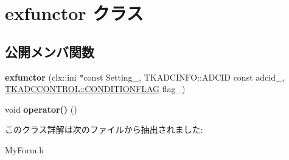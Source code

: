 \hypertarget{classexfunctor}{}\section{exfunctor クラス}
\label{classexfunctor}
\subsection*{公開メンバ関数}
\begin{DoxyCompactItemize}
\item 
\mbox{\label{classexfunctor_a046e03c5618e10bc3a3145af0fe97c6d}} 
{\bfseries exfunctor} (clx\+::ini $\ast$const Setting\+\_\+, T\+K\+A\+D\+C\+I\+N\+F\+O\+::\+A\+D\+C\+ID const adcid\+\_\+, \hyperlink{class_t_k_a_d_c_c_o_n_t_r_o_l_a4ec8bb3e68a489f7a757d08a855ffb61}{T\+K\+A\+D\+C\+C\+O\+N\+T\+R\+O\+L\+::\+C\+O\+N\+D\+I\+T\+I\+O\+N\+F\+L\+AG} flag\+\_\+)
\item 
\mbox{\label{classexfunctor_add31fc15807f9bc3efe7761173213c44}} 
void {\bfseries operator()} ()
\end{DoxyCompactItemize}


このクラス詳解は次のファイルから抽出されました\+:\begin{DoxyCompactItemize}
\item 
My\+Form.\+h\end{DoxyCompactItemize}
